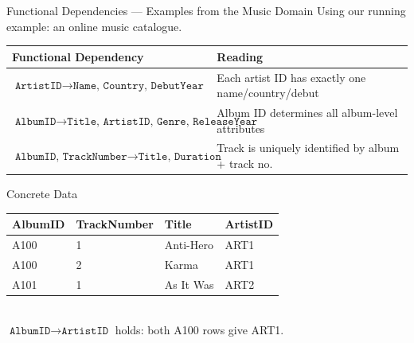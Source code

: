 \begin{frame}{Functional Dependencies --- Examples from the Music Domain}
  Using our running example: an online music catalogue.

  \vspace{6pt}
  \begin{center}
    \small
    \begin{tabular}{ll}
      \toprule
      \textbf{Functional Dependency} & \textbf{Reading} \\
      \midrule
      $\texttt{ArtistID} \to \texttt{Name, Country, DebutYear}$ & Each artist ID has exactly one name/country/debut \\
      $\texttt{AlbumID} \to \texttt{Title, ArtistID, Genre, ReleaseYear}$ & Album ID determines all album-level attributes \\
      $\texttt{AlbumID, TrackNumber} \to \texttt{Title, Duration}$ & Track is uniquely identified by album + track no. \\
      \bottomrule
    \end{tabular}
  \end{center}

  \vspace{6pt}
  \begin{examples}{Concrete Data}
    \scriptsize
    \begin{tabular}{llll}
      \toprule
      \textbf{AlbumID} & \textbf{TrackNumber} & \textbf{Title} & \textbf{ArtistID} \\
      \midrule
      A100 & 1 & Anti-Hero     & ART1 \\
      A100 & 2 & Karma         & ART1 \\
      A101 & 1 & As It Was     & ART2 \\
      \bottomrule
    \end{tabular}\\[4pt]
    \normalsize
    $\texttt{AlbumID} \to \texttt{ArtistID}$ holds: both A100 rows give ART1.
  \end{examples}
\end{frame}

